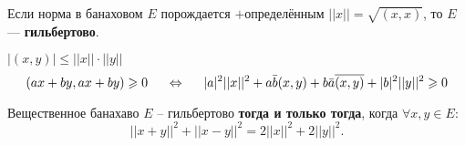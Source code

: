 \begin{to_def}
	Если норма в банаховом $E$ порождается $+$определённым $||x|| = \sqrt{(x,x)}$, то $E$ --- \textbf{гильбертово}. 
\end{to_def}

\begin{to_thr}
	$|(x,y)| \leq ||x|| \cdot ||y||$
	\begin{equation*}
		(ax + by, ax + by) \geq 0 
		\hspace{0.5 cm}
		\Leftrightarrow
		\hspace{0.5 cm}
		|a|^2 ||x||^2 + a \bar{b} (x,y) + b \bar{a} \overline{(x,y)} + |b|^2 ||y||^2 \geq 0
	\end{equation*}
\end{to_thr}

\begin{to_thr}
	Вещественное банахаво $E$ -- гильбертово \textbf{тогда и только тогда}, когда $\forall x,y \in E$:
	\begin{equation*}
		||x+y||^2 + ||x-y||^2 = 2 ||x||^2 + 2 ||y||^2.
	\end{equation*}
\end{to_thr}